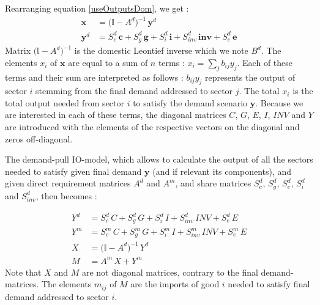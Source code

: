 \documentclass[12pt,english]{article}
\begin{document}
Rearranging equation \ref{useOutputsDom}, we get :
\begin{align}
\boldsymbol{x} &= \big(\mathbb{I} - A^d \big)^{-1} \, \boldsymbol{y}^d \nonumber \\
\boldsymbol{y}^d &= S^d_{c} \, \boldsymbol{c} + S^d_{g} \, \boldsymbol{g} + S^d_{i} \, \boldsymbol{i} + S^d_{inv} \, \boldsymbol{inv} + S^d_{e} \, \boldsymbol{e}
\end{align}
Matrix $\big(\mathbb{I} - A^d \big)^{-1}$ is the domestic Leontief inverse which we note $B^d$. The elements $x_i$ of $\boldsymbol{x}$ are equal to a sum of $n$ terms : $x_i = \sum_j b_{ij}y_j$. Each of these terms and their sum are interpreted as follows : $b_{ij}y_j$ represents the output of sector $i$ stemming from the final demand addressed to sector $j$. The total $x_i$ is the total output needed from sector $i$ to satisfy the demand scenario $\boldsymbol{y}$. Because we are interested in each of these terms, the diagonal matrices $C$, $G$, $E$, $I$, $INV$ and $Y$ are introduced with the elements of the respective vectors on the diagonal and zeros off-diagonal. 


The demand-pull IO-model, which allows to calculate the output of all the sectors needed to satisfy given final demand $\boldsymbol{y}$ (and if relevant its components), and given direct requirement matrices $A^d$ and $A^m$, and share matrices $S^d_{c}$, $S^d_{g}$, $S^d_{e}$, $S^d_{i}$ and $S^d_{inv}$, then becomes :

\begin{align}
Y^d &= S^d_{c} \, C + S^d_{g} \, G + S^d_{i} \, I + S^d_{inv} \, INV + S^d_{e} \, E \\
Y^m &= S^m_{c} \,C + S^m_{g}\, G + S^m_{i}\, I + S^m_{inv}\, INV + S^m_{e}\, E \\
X &= \big(\mathbb{I} - A^d \big)^{-1} \, Y^d  \\
M &= A^m \, X + Y^m
\end{align}
Note that $X$ and $M$ are not diagonal matrices, contrary to the final demand-matrices. The elements $m_{ij}$ of $M$ are the imports of good $i$ needed to satisfy final demand addressed to sector $i$.
\end{document}
